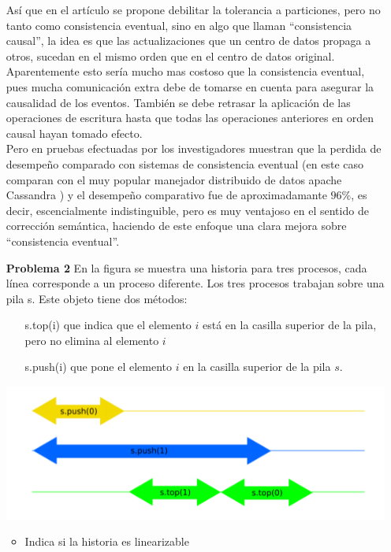 \documentclass{article}
\begin{document}
\begin{enumerate}
Así que en el artículo se propone debilitar la tolerancia a particiones, pero no tanto como consistencia eventual, sino en algo que llaman ``consistencia causal'', la idea es que las actualizaciones que un centro de datos propaga a otros, sucedan en el mismo orden que en el centro de datos original. Aparentemente esto sería mucho mas costoso que la consistencia eventual, pues mucha comunicación extra debe de tomarse en cuenta para asegurar la causalidad de los eventos. También se debe retrasar la aplicación de las operaciones de escritura hasta que todas las operaciones anteriores en orden causal hayan tomado efecto.\\

Pero en pruebas efectuadas por los investigadores muestran que la perdida de desempeño comparado con sistemas de consistencia eventual (en este caso comparan con el muy popular manejador distribuido de datos apache Cassandra ) y el desempeño comparativo fue de aproximadamante $96\%$, es decir, escencialmente indistinguible, pero es muy ventajoso en el sentido de corrección semántica, haciendo de este enfoque una clara mejora sobre ``consistencia eventual''.


\item[\bf{Problema 2}] En la figura se muestra una historia para tres procesos, cada línea corresponde a un proceso diferente. Los tres procesos trabajan sobre una pila s. Este objeto tiene dos métodos:\\
\begin{itemize}
\item[{s.top(i)}] que indica que el elemento $i$ está en la casilla superior de la pila, pero no elimina al elemento $i$
\item[{s.push(i)}] que pone el elemento $i$ en la casilla superior de la pila $s$.
\end{itemize}

\begin{center}
  \includegraphics{t10f1.png}
\end{center}

\begin{itemize}
\item  Indica si la historia es linearizable


\end{itemize}
\end{enumerate}
\end{document}
